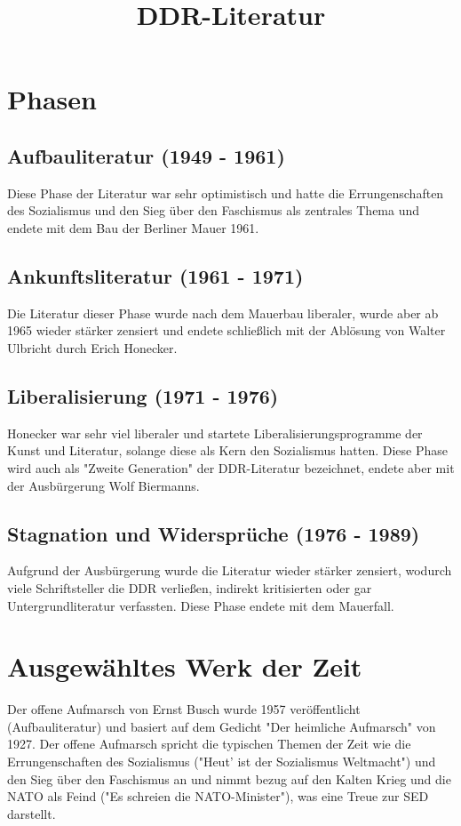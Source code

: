\documentclass[8pt, letterpaper]{article}
\begin{document}
\date{\vspace{-5ex}}
\title{DDR-Literatur}
\maketitle

\section{Phasen}

\subsection{Aufbauliteratur (1949 - 1961)}
Diese Phase der Literatur war sehr optimistisch und hatte die Errungenschaften des Sozialismus und den Sieg über den Faschismus als zentrales Thema und endete mit dem Bau der Berliner Mauer 1961.

\subsection{Ankunftsliteratur (1961 - 1971)}
Die Literatur dieser Phase wurde nach dem Mauerbau liberaler, wurde aber ab 1965 wieder stärker zensiert und endete schließlich mit der Ablösung von Walter Ulbricht durch Erich Honecker.

\subsection{Liberalisierung (1971 - 1976)}
Honecker war sehr viel liberaler und startete Liberalisierungsprogramme der Kunst und Literatur, solange diese als Kern den Sozialismus hatten. Diese Phase wird auch als "Zweite Generation" der DDR-Literatur bezeichnet, endete aber mit der Ausbürgerung Wolf Biermanns.

\subsection{Stagnation und Widersprüche (1976 - 1989)}
Aufgrund der Ausbürgerung wurde die Literatur wieder stärker zensiert, wodurch viele Schriftsteller die DDR verließen, indirekt kritisierten oder gar Untergrundliteratur verfassten. Diese Phase endete mit dem Mauerfall.

\section{Ausgewähltes Werk der Zeit}
Der offene Aufmarsch von Ernst Busch wurde 1957 veröffentlicht (Aufbauliteratur) und basiert auf dem Gedicht "Der heimliche Aufmarsch" von 1927. Der offene Aufmarsch spricht die typischen Themen der Zeit wie die Errungenschaften des Sozialismus ("Heut' ist der Sozialismus Weltmacht") und den Sieg über den Faschismus an und nimmt bezug auf den Kalten Krieg und die NATO als Feind ("Es schreien die NATO-Minister"), was eine Treue zur SED darstellt.\newline
\end{document}
